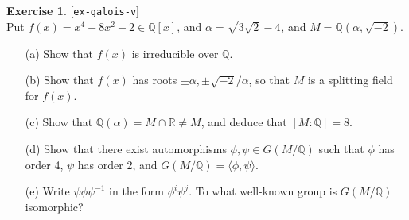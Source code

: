 \documentclass{amsart}
\newcommand{\Q}         {{\mathbb{Q}}}
\newcommand{\R}         {{\mathbb{R}}}
\newcommand{\al}        {\alpha}
\renewcommand{\:}{\colon}
\newcommand{\lastexlabel}{}
\newcommand{\exlabel}[1]{
 \global\def\lastexlabel{#1}\label{#1}[\texttt{#1}]\ \\
}
\newcommand{\exlabel}[1]{
 \global\def\lastexlabel{#1}\label{#1}
}
\theoremstyle{definition}
\newtheorem{exercise}{Exercise}[section]
\begin{document}
\begin{exercise}\exlabel{ex-galois-v}
 Put $f(x)=x^4+8x^2-2\in\Q[x]$, and $\al=\sqrt{3\sqrt{2}-4}$, and
 $M=\Q(\al,\sqrt{-2})$.  
 \begin{itemize}
  \item[(a)] Show that $f(x)$ is irreducible over $\Q$.
  \item[(b)] Show that $f(x)$ has roots $\pm\al,\pm\sqrt{-2}/\al$, so
   that $M$ is a splitting field for $f(x)$.
  \item[(c)] Show that $\Q(\al)=M\cap\R\neq M$, and deduce that
   $[M:\Q]=8$.
  \item[(d)] Show that there exist automorphisms
   $\phi,\psi\in G(M/\Q)$ such that $\phi$ has order 4, $\psi$ has
   order 2, and $G(M/\Q)=\langle\phi,\psi\rangle$.
  \item[(e)] Write $\psi\phi\psi^{-1}$ in the form $\phi^i\psi^j$. To
   what well-known group is $G(M/\Q)$ isomorphic?
 \end{itemize}
\end{exercise}
\end{document}
